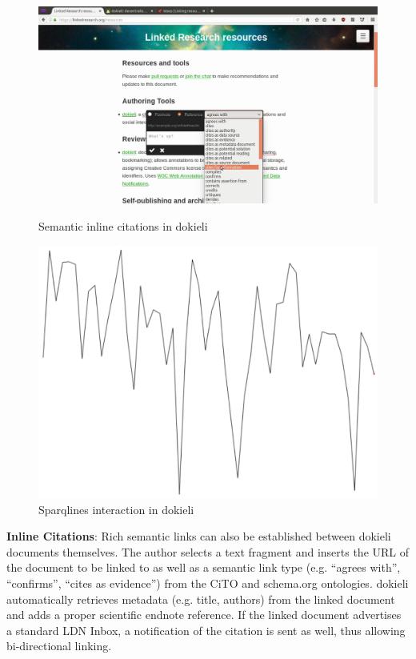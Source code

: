 \documentclass[a4paper]{llncs}
\begin{document}
\begin{figure}
  \begin{minipage}[b]{.49\textwidth}
    \includegraphics[width=\textwidth]{media/images/dokieli-citation}
    \caption{Semantic inline citations in dokieli}
    \label{fig:dokieli-citation}
  \end{minipage}
  \hfill
  \begin{minipage}[b]{.49\textwidth}
    \includegraphics[width=\textwidth]{media/images/dokieli-sparqlines}
    \caption{Sparqlines interaction in dokieli}
    \label{fig:dokieli-sparqlines}
  \end{minipage}
\end{figure}


\par \textbf{Inline Citations}: Rich semantic links can also be established between dokieli documents themselves.
                                    The author selects a text fragment and inserts the URL of the document to be linked to as well as a semantic link type (e.g. “agrees with”, “confirms”, “cites as evidence”) from the CiTO and schema.org ontologies. dokieli automatically retrieves metadata (e.g. title, authors) from the linked document and adds a proper scientific endnote reference. If the linked document advertises a standard LDN Inbox, a notification of the citation is sent as well, thus allowing bi-directional linking.
                                    
\end{document}
